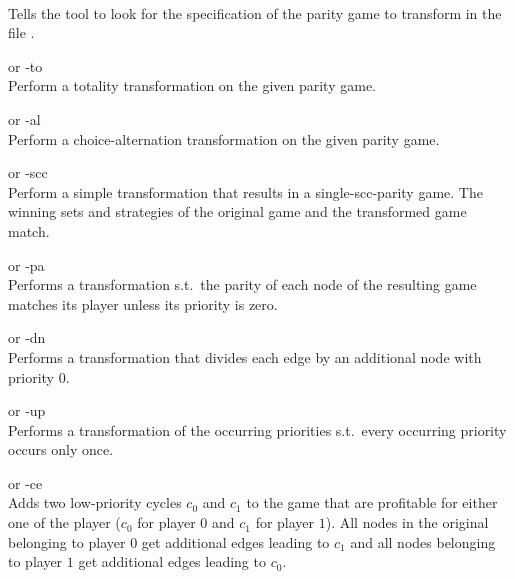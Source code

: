 \begin{description}
\itemsep3mm
\item[\nonterminal{filename}] \ \\
   Tells the tool to look for the specification of the parity game to transform in the file
   .

\item[{\ttfamily --total}] \enspace or {\ttfamily -to} \\
   Perform a totality transformation on the given parity game.

\item[{\ttfamily --alternating}] \enspace or {\ttfamily -al} \\
   Perform a choice-alternation transformation on the given parity game.

 \item[{\ttfamily --singlescc}] \enspace or {\ttfamily -scc} \\
   Perform a simple transformation that results in a single-scc-parity game. The winning sets and
   strategies of the original game and the transformed game match.

 \item[{\ttfamily --prioalignment}] \enspace or {\ttfamily -pa} \\
   Performs a transformation s.t.\ the parity of each node of the resulting game matches its player
   unless its priority is zero.

\item[{\ttfamily --dummynodes}] \enspace or {\ttfamily -dn} \\
   Performs a transformation that divides each edge by an additional node with priority $0$.

\item[{\ttfamily --uniquizeprios}] \enspace or {\ttfamily -up} \\
   Performs a transformation of the occurring priorities s.t.\ every occurring priority occurs only once.

 \item[{\ttfamily --cheapescapecycles}] \enspace or {\ttfamily -ce} \\
   Adds two low-priority cycles $c_0$ and $c_1$ to the game that are profitable for either one of the
   player ($c_0$ for player $0$ and $c_1$ for player $1$). All nodes in the original belonging to
   player $0$ get additional edges leading to $c_1$ and all nodes belonging to player $1$ get
   additional edges leading to $c_0$.


\end{description}
